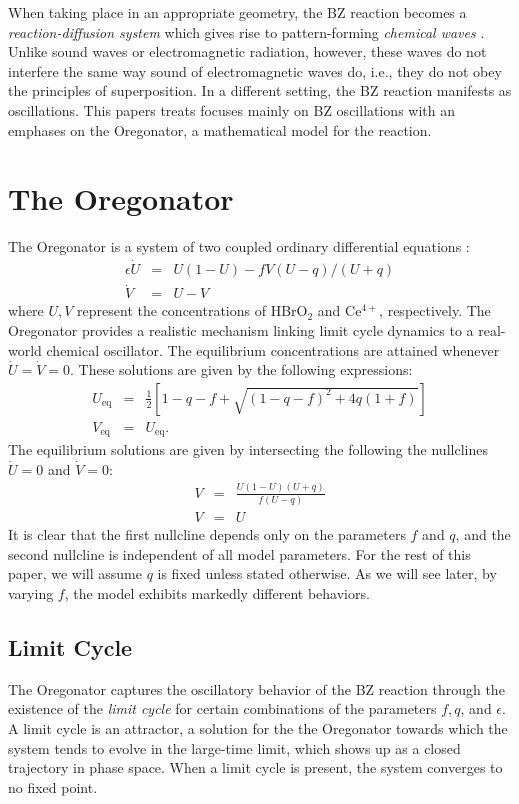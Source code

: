 \documentclass[twocolumn,amsmath,amssymb,aps]{revtex4}
\begin{document}
When taking place in an appropriate geometry, the BZ reaction becomes a \textit{reaction-diffusion system} which gives rise to pattern-forming \textit{chemical waves} \cite{ball1999self}. Unlike sound waves or electromagnetic radiation, however, these waves do not interfere the same way sound of electromagnetic waves do, i.e., they do not obey the principles of superposition. In a different setting, the BZ reaction manifests as oscillations. This papers treats focuses mainly on BZ oscillations with an emphases on the Oregonator, a mathematical model for the reaction. 

\section{The Oregonator}
The Oregonator is a system of two coupled ordinary differential equations \cite{doi:10.1063/1.1681288}:
\begin{eqnarray}
\epsilon \dot{U} &=& U(1-U) - fV(U-q)/(U+q) \\
\dot{V} &=&  U-V
\end{eqnarray}
where $U,V$ represent the concentrations of HBrO$_2$ and Ce$^{4+}$, respectively. The Oregonator provides a realistic mechanism linking limit cycle dynamics to a real-world chemical oscillator. The equilibrium concentrations are attained whenever $\dot{U} = \dot{V} = 0$. These solutions are given by the following expressions:
\begin{eqnarray}
U_{\text{eq}} &=& \frac{1}{2}\left[1-q-f + \sqrt{(1-q-f)^2 + 4q(1+f)}\right]\nonumber \\ 
V_{\text{eq}} &=& U_{\text{eq}}. 
\end{eqnarray}
The equilibrium solutions are given by intersecting the following the nullclines $\dot{U} = 0$ and $\dot{V} = 0$:
\begin{eqnarray} 
V &=& \frac{U(1-U)(U+q)}{f(U-q)}\\
V &=&U 
\end{eqnarray}
It is clear that the first nullcline depends only on the parameters $f$ and $q$, and the second nullcline is independent of all model parameters. For the rest of this paper, we will assume $q$ is fixed unless stated otherwise. As we will see later, by varying $f$, the model exhibits markedly different behaviors. 

\subsection{Limit Cycle}
The Oregonator captures the oscillatory behavior of the BZ reaction through the existence of the \textit{limit cycle} for certain combinations of the parameters $f,q$, and $\epsilon$. A limit cycle is an attractor, a solution for the the Oregonator towards which the system tends to evolve in the large-time limit, which shows up as a closed trajectory in phase space. When a limit cycle is present, the system converges to no fixed point. 
\end{document}
